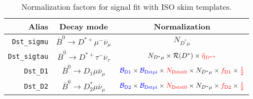 \begin{landscape}
\begin{table}
\centering
\caption{
    Normalization factors for \Dstar signal fit with ISO skim templates.
}
\label{tab:fit-norm-fact-dst}
\scriptsize

\begin{tabular}{r|c|c}
\toprule
        \textbf{Alias} &                                \textbf{Decay mode}                                &                                                                                                                                                                               \textbf{Normalization}                                                                                                                                                                               \\
\midrule
   \texttt{Dst\_sigmu} &           $\overline{B}^0 \rightarrow D^{*+} \mu^- \overline{\nu}_\mu$            &                                                                                                                                                                                   $N_{D^* \mu}$                                                                                                                                                                                    \\
  \texttt{Dst\_sigtau} &          $\overline{B}^0 \rightarrow D^{*+} \tau^- \overline{\nu}_\tau$           &                                                                                                                                                $N_{D^* \mu} \times \mathcal{R}(D^*) \times \textcolor{red}{\tilde{\eta}_{D^{*+}}}$                                                                                                                                                 \\
      \texttt{Dst\_D1} &              $\overline{B}^0 \rightarrow D_1 \mu \overline{\nu}_\mu$              &                                                                           $\textcolor{blue}{\mathcal{B}_\text{D1}} \times \textcolor{blue}{\mathcal{B}_\text{Dstpi}} \times \textcolor{red}{N_\text{Dstst0}} \times N_{D^* \mu} \times \textcolor{red}{f_\text{D1}} \times \textcolor{red}{\frac{1}{2}}$                                                                           \\
      \texttt{Dst\_D2} &             $\overline{B}^0 \rightarrow D^*_2 \mu \overline{\nu}_\mu$             &                                                                           $\textcolor{blue}{\mathcal{B}_\text{D2}} \times \textcolor{blue}{\mathcal{B}_\text{Dstpi}} \times \textcolor{red}{N_\text{Dstst0}} \times N_{D^* \mu} \times \textcolor{red}{f_\text{D2}} \times \textcolor{red}{\frac{1}{2}}$                                                                           \\

\end{tabular}
\end{table}
\end{landscape}

